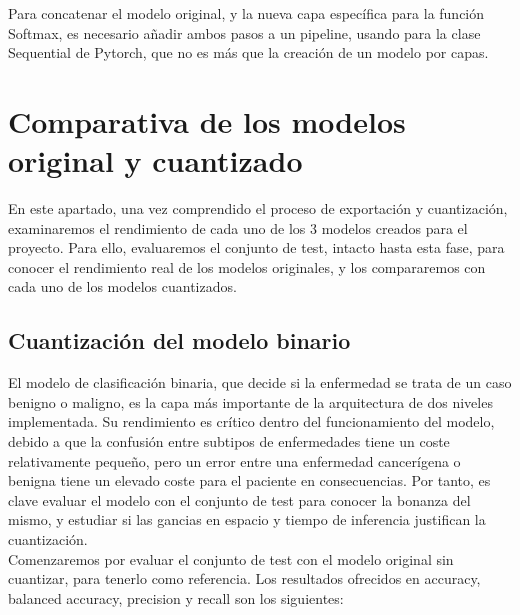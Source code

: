 Para concatenar el modelo original, y la nueva capa específica para la función Softmax, es necesario añadir ambos pasos a un pipeline, usando para la clase Sequential de Pytorch, que no es más que la creación de un modelo por capas.\\

\section{Comparativa de los modelos original y cuantizado}

En este apartado, una vez comprendido el proceso de exportación y cuantización, examinaremos el rendimiento de cada uno de los 3 modelos creados para el proyecto. Para ello, evaluaremos el conjunto de test, intacto hasta esta fase, para conocer el rendimiento real de los modelos originales, y los compararemos con cada uno de los modelos cuantizados.

\subsection{Cuantización del modelo binario}

El modelo de clasificación binaria, que decide si la enfermedad se trata de un caso benigno o maligno, es la capa más importante de la arquitectura de dos niveles implementada. Su rendimiento es crítico dentro del funcionamiento del modelo, debido a que la confusión entre subtipos de enfermedades tiene un coste relativamente pequeño, pero un error entre una enfermedad cancerígena o benigna tiene un elevado coste para el paciente en consecuencias. Por tanto, es clave evaluar el modelo con el conjunto de test para conocer la bonanza del mismo, y estudiar si las gancias en espacio y tiempo de inferencia justifican la cuantización.\\

Comenzaremos por evaluar el conjunto de test con el modelo original sin cuantizar, para tenerlo como referencia. Los resultados ofrecidos en accuracy, balanced accuracy, precision y recall son los siguientes:


